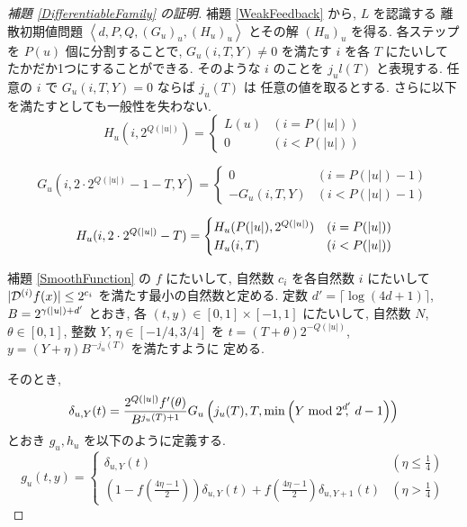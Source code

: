  \begin{proof}[\rm 補題 \ref{DifferentiableFamily} の証明]
  補題 \ref{WeakFeedback} から, $L$ を認識する 
  離散初期値問題 $\left< d, P, Q,(G_u)_u,(H_u)_u \right>$
  とその解 $(H_u)_u$ を得る.
  各ステップを $P(u)$ 個に分割することで, $G_u(i, T, Y) \not = 0$ を満たす
  $i$ を各 $T$ にたいしてたかだか1つにすることができる. そのような $i$ のことを 
  $j_ul(T)$ と表現する. 任意の $i$ で $G_u(i, T, Y) = 0$ ならば $j_u(T)$ は
  任意の値を取るとする. 
  さらに以下を満たすとしても一般性を失わない.
  \begin{equation}
   H_u(i, 2^{Q(|u|)}) = \begin{cases}
			 L(u) & (i=P(|u|)) \\
			0 & (i<P(|u|))
			\end{cases}
  \end{equation}

 \begin{equation}
  G_u(i, 2\cdot 2^{Q(|u|)} - 1 - T, Y) 
   = \begin{cases}
      0 & (i=P(|u|)-1) \\
      -G_u(i,T,Y) & (i<P(|u|)-1)
     \end{cases}
 \end{equation}

 \begin{equation}
  H_u(i, 2 \cdot 2^{Q(|u|)} - T) 
  = \begin{cases}
    H_u(P(|u|), 2^{Q(|u|)}) & (i={P(|u|)}) \\
    H_u(i, T) &  (i<P(|u|))
    \end{cases}
 \end{equation}

  補題 \ref{SmoothFunction} の $f$ にたいして, 
 自然数 $c_i$ を各自然数 $i$ にたいして 
  $|\mathcal D^{(i)}f(x)| \le 2^{c_i}$ を満たす最小の自然数と定める.
 定数 $d' = \lceil \log (4d + 1) \rceil$, 
 $B = 2^{{\gamma(|u|)} + d'}$ とおき, 
 各 $(t, y) \in [0,1] \times [-1, 1]$ にたいして,
 自然数 $N$, $\theta \in [0,1]$, 整数 $Y$, $\eta \in [-1/4, 3/4]$ を
 $t = (T + \theta)2^{-Q(|u|)}$, $y = (Y + \eta)B^{-j_u(T)}$ を満たすように
 定める.
 
 そのとき,
 \begin{equation}
  \delta_{u, Y} (t) = \frac{2^{Q(|u|)} f'(\theta)}{B^{j_u(T)+1}} 
   G_u\left( j_u(T), T, \min \left(Y \bmod 2^{d'}\!\!\!,\ d-1 \right) \right)
 \end{equation}
 とおき $g_u, h_u$ を以下のように定義する.
 \begin{equation}
  g_u(t,y) 
  = \begin{cases}
     \delta_{u, Y}(t)& (\eta \le \frac 1 4) \\
     ( 1-f ( \frac{4\eta-1}{2})) \delta_{u, Y}(t) 
     + f ( \frac{4\eta-1}{2}) \delta_{u,Y+1}(t)
     & (\eta > \frac 1 4)
    \end{cases}
  \label{eq:gu}
 \end{equation}


\end{proof}
